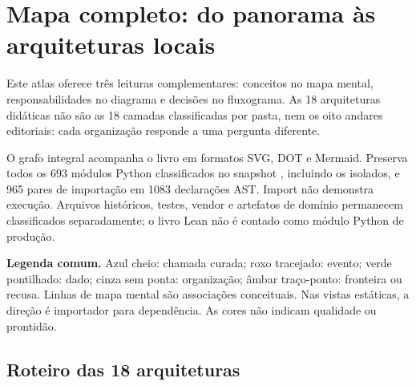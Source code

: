 \clearpage\section{Mapa completo: do panorama às arquiteturas locais}

\label{sec:atlas-integral-r911}

Este atlas oferece três leituras complementares: conceitos no mapa mental, responsabilidades no diagrama e decisões no fluxograma. As 18 arquiteturas didáticas não são as 18 camadas classificadas por pasta, nem os oito andares editoriais: cada organização responde a uma pergunta diferente.

O grafo integral acompanha o livro em formatos SVG, DOT e Mermaid. Preserva todos os 693 módulos Python classificados no snapshot , incluindo os isolados, e 965 pares de importação em 1083 declarações AST. Import não demonstra execução. Arquivos históricos, testes, vendor e artefatos de domínio permanecem classificados separadamente; o livro Lean não é contado como módulo Python de produção.

\begin{descricao}\textbf{Legenda comum.} Azul cheio: chamada curada; roxo tracejado: evento; verde pontilhado: dado; cinza sem ponta: organização; âmbar traço-ponto: fronteira ou recusa. Linhas de mapa mental são associações conceituais. Nas vistas estáticas, a direção é importador para dependência. As cores não indicam qualidade ou prontidão.\end{descricao}

\subsection*{Roteiro das 18 arquiteturas}

